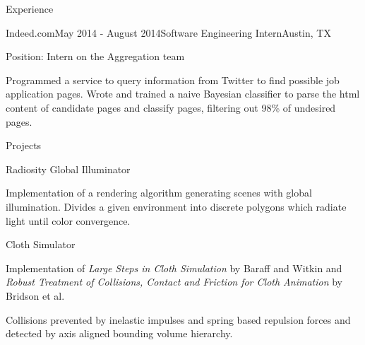 \documentclass{resume} %
\begin{document}
\begin{rSection}{Experience}

\begin{rSubsection}{Indeed.com}{May 2014 - August 2014}{Software Engineering Intern}{Austin, TX}
\item Position: Intern on the Aggregation team
\item Programmed a service to query information from Twitter to find possible
    job application pages. Wrote and trained a naive Bayesian classifier to
    parse the html content of candidate pages and classify pages, filtering out
    98\% of undesired pages. 
\end{rSubsection}

\end{rSection}

\begin{rSection}{Projects}

  \begin{rSubsection}{Radiosity Global Illuminator}{}{}{}
  \item Implementation of a rendering algorithm generating scenes with global
      illumination. Divides a given environment into discrete polygons which
      radiate light until color convergence. 
  \end{rSubsection}

  \begin{rSubsection}{Cloth Simulator}{}{}{}
  \item Implementation of \textit{Large Steps in Cloth Simulation} by Baraff and
      Witkin and \textit{Robust Treatment of Collisions, Contact and Friction
      for Cloth Animation} by Bridson et al. 
  \item Collisions prevented by inelastic impulses and spring based repulsion
      forces and detected by axis aligned bounding volume hierarchy.
  \end{rSubsection}

\end{rSection}

\end{document}
